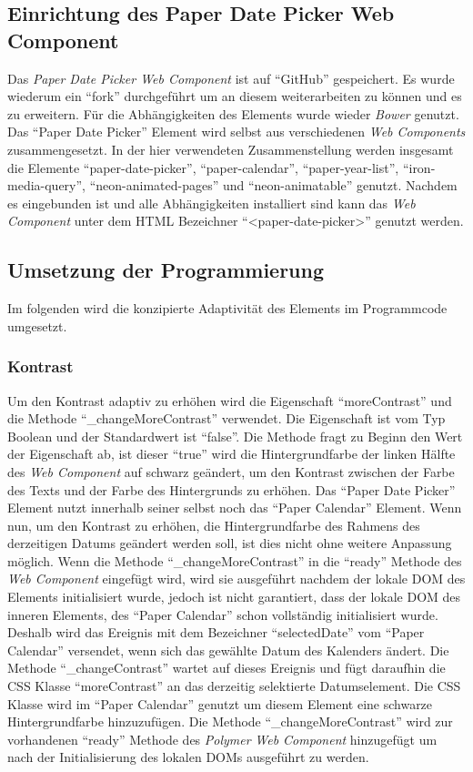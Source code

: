 \documentclass[12pt, paper=a4, bibtotoc, toc=listof, headsepline=true]{scrreprt}
\begin{document}
		\subsection{Einrichtung des Paper Date Picker Web Component}
		Das \emph{Paper Date Picker Web Component} ist auf \enquote{GitHub} gespeichert. Es wurde wiederum ein \enquote{fork} durchgeführt um an diesem weiterarbeiten zu können und es zu erweitern. Für die Abhängigkeiten des Elements wurde wieder \emph{Bower} genutzt. Das \enquote{Paper Date Picker} Element wird selbst aus verschiedenen \emph{Web Components} zusammengesetzt. In der hier verwendeten Zusammenstellung werden insgesamt die Elemente \enquote{paper-date-picker}, \enquote{paper-calendar}, \enquote{paper-year-list}, \enquote{iron-media-query}, \enquote{neon-animated-pages} und \enquote{neon-animatable} genutzt. Nachdem es eingebunden ist und alle Abhängigkeiten installiert sind kann das \emph{Web Component} unter dem \ac{HTML} Bezeichner \enquote{<paper-date-picker>} genutzt werden.
		\subsection{Umsetzung der Programmierung}
		Im folgenden wird die konzipierte Adaptivität des Elements im Programmcode umgesetzt. 
		\subsubsection{Kontrast}
		Um den Kontrast adaptiv zu erhöhen wird die Eigenschaft \enquote{moreContrast} und die Methode \enquote{\_changeMoreContrast} verwendet. Die Eigenschaft ist vom Typ Boolean und der Standardwert ist \enquote{false}. Die Methode fragt zu Beginn den Wert der Eigenschaft ab, ist dieser \enquote{true} wird die Hintergrundfarbe der linken Hälfte des \emph{Web Component} auf schwarz geändert, um den Kontrast zwischen der Farbe des Texts und der Farbe des Hintergrunds zu erhöhen. Das \enquote{Paper Date Picker} Element nutzt innerhalb seiner selbst noch das \enquote{Paper Calendar} Element. Wenn nun, um den Kontrast zu erhöhen, die Hintergrundfarbe des Rahmens des derzeitigen Datums geändert werden soll, ist dies nicht ohne weitere Anpassung möglich. Wenn die Methode \enquote{\_changeMoreContrast} in die \enquote{ready} Methode des \emph{Web Component} eingefügt wird, wird sie ausgeführt nachdem der lokale \ac{DOM} des Elements initialisiert wurde, jedoch ist nicht garantiert, dass der lokale \ac{DOM} des inneren Elements, des \enquote{Paper Calendar} schon vollständig initialisiert wurde. Deshalb wird das Ereignis mit dem Bezeichner \enquote{selectedDate} vom \enquote{Paper Calendar} versendet, wenn sich das gewählte Datum des Kalenders ändert. Die Methode \enquote{\_changeContrast} wartet auf dieses Ereignis und fügt daraufhin die \ac{CSS} Klasse \enquote{moreContrast} an das derzeitig selektierte Datumselement. Die \ac{CSS} Klasse wird im \enquote{Paper Calendar} genutzt um diesem Element eine schwarze Hintergrundfarbe hinzuzufügen. Die Methode \enquote{\_changeMoreContrast} wird zur vorhandenen \enquote{ready} Methode des \emph{Polymer} \emph{Web Component} hinzugefügt um nach der Initialisierung des lokalen \ac{DOM}s ausgeführt zu werden.
\end{document}

